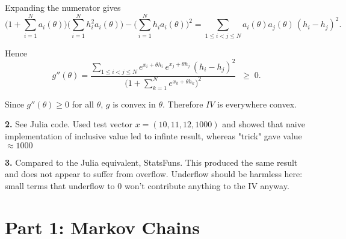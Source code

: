 \documentclass{article}
\begin{document}
    Expanding the numerator gives
    \[
    \Big(1+\sum_{i=1}^N a_i(\theta)\Big)\Big(\sum_{i=1}^N h_i^2 a_i(\theta)\Big)
    - \Big(\sum_{i=1}^N h_i a_i(\theta)\Big)^2
    = \sum_{1 \le i < j \le N} a_i(\theta)a_j(\theta)\,(h_i-h_j)^2.
    \]
    
    Hence
    \[
    g''(\theta)
    = \frac{\sum_{1 \le i < j \le N}
    e^{x_i+\theta h_i}\, e^{x_j+\theta h_j}\,(h_i-h_j)^2}
    {\Big(1+\sum_{k=1}^N e^{x_k+\theta h_k}\Big)^2}
    \;\;\ge\; 0.
    \]
    
    Since $g''(\theta)\ge 0$ for all $\theta$, $g$ is convex in $\theta$.  
    Therefore $IV$ is everywhere convex.

    \vspace{5mm}

    \textbf{2.} See Julia code. Used test vector $x = (10,11,12,1000)$ and showed that naive implementation of inclusive value led to infinte result, whereas "trick" gave value $\approx 1000$

    \vspace{5mm}

    \textbf{3.} Compared to the Julia equivalent, StatsFuns. This produced the same result and does not appear to suffer from overflow. Underflow should be harmless here: small terms that underflow to 0 won't contribute anything to the IV anyway.






\section*{Part 1: Markov Chains}
\end{document}

